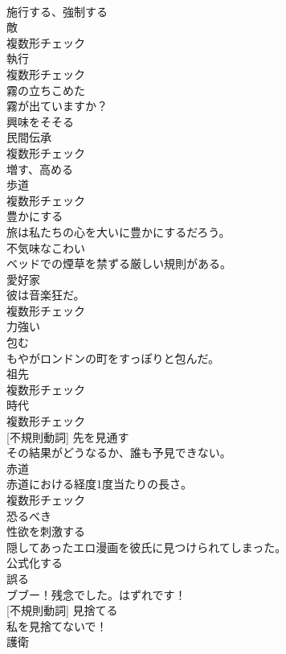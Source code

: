 \documentclass[8pt]{extreport}
\begin{document}
\begin{CJK}{UTF8}{min}
\\	[動詞]	施行する、強制する	
\\	[名詞]	敵	
\\	複数形チェック
\\	[名詞]	執行	
\\	複数形チェック
\\	[形容詞]	霧の立ちこめた	
\\	霧が出ていますか？	
\\	[形容詞]	興味をそそる	
\\	[名詞]	⺠間伝承	
\\	複数形チェック
\\	[動詞]	増す、高める	
\\	[名詞]	歩道	
\\	複数形チェック
\\	[動詞]	豊かにする	
\\	旅は私たちの心を大いに豊かにするだろう。	
\\	[形容詞]	不気味なこわい	
\\	ベッドでの煙草を禁ずる厳しい規則がある。	
\\	[名詞]	愛好家	
\\	彼は音楽狂だ。	
\\	複数形チェック
\\	[形容詞]	力強い	
\\	[動詞]	包む	
\\	もやがロンドンの町をすっぽりと包んだ。	
\\	[名詞]	祖先	
\\	複数形チェック
\\	[名詞]	時代	
\\	複数形チェック
\\	[動詞] [不規則動詞]	先を見通す	
\\	その結果がどうなるか、誰も予見できない。	
\\	[名詞]	赤道	
\\	赤道における経度1度当たりの長さ。	
\\	複数形チェック
\\	[形容詞]	恐るべき	
\\	[形容詞]	性欲を刺激する	
\\	隠してあったエロ漫画を彼氏に見つけられてしまった。	
\\	[動詞]	公式化する	
\\	[動詞]	誤る	
\\	ブブー！残念でした。はずれです！	
\\	[動詞] [不規則動詞]	見捨てる	
\\	私を見捨てないで！	
\\	[名詞]	護衛	

\end{CJK}
\end{document}
